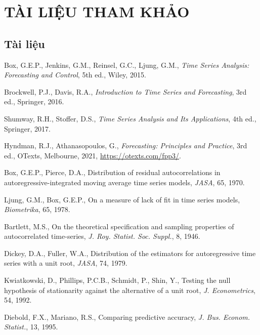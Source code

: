 \clearpage
{}
\section*{TÀI LIỆU THAM KHẢO}

\begingroup
\small
\subsection*{Tài liệu}
\begin{enumerate}[label={[\arabic*]},leftmargin=1.2cm,itemsep=1pt,topsep=2pt]
\item \hypertarget{tl1}{}Box, G.E.P., Jenkins, G.M., Reinsel, G.C., Ljung, G.M., \textit{Time Series Analysis: Forecasting and Control}, 5th ed., Wiley, 2015.
\item \hypertarget{tl2}{}Brockwell, P.J., Davis, R.A., \textit{Introduction to Time Series and Forecasting}, 3rd ed., Springer, 2016.
\item \hypertarget{tl3}{}Shumway, R.H., Stoffer, D.S., \textit{Time Series Analysis and Its Applications}, 4th ed., Springer, 2017.
\item \hypertarget{tl4}{}Hyndman, R.J., Athanasopoulos, G., \textit{Forecasting: Principles and Practice}, 3rd ed., OTexts, Melbourne, 2021, \url{https://otexts.com/fpp3/}.
\item \hypertarget{tl5}{}Box, G.E.P., Pierce, D.A., Distribution of residual autocorrelations in autoregressive-integrated moving average time series models, \textit{JASA}, 65, 1970.
\item \hypertarget{tl6}{}Ljung, G.M., Box, G.E.P., On a measure of lack of fit in time series models, \textit{Biometrika}, 65, 1978.
\item \hypertarget{tl7}{}Bartlett, M.S., On the theoretical specification and sampling properties of autocorrelated time-series, \textit{J. Roy. Statist. Soc. Suppl.}, 8, 1946.
\item \hypertarget{tl8}{}Dickey, D.A., Fuller, W.A., Distribution of the estimators for autoregressive time series with a unit root, \textit{JASA}, 74, 1979.
\item \hypertarget{tl9}{}Kwiatkowski, D., Phillips, P.C.B., Schmidt, P., Shin, Y., Testing the null hypothesis of stationarity against the alternative of a unit root, \textit{J. Econometrics}, 54, 1992.
\item \hypertarget{tl10}{}Diebold, F.X., Mariano, R.S., Comparing predictive accuracy, \textit{J. Bus. Econom. Statist.}, 13, 1995.

\end{enumerate}
